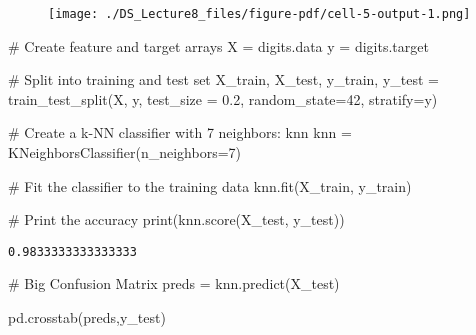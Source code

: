 \documentclass[
  letterpaper,
  DIV=11,
  numbers=noendperiod]{scrreprt}
\newenvironment{Shaded}{\begin{snugshade}}{\end{snugshade}}
\newcommand{\BuiltInTok}[1]{\textcolor[rgb]{0.00,0.23,0.31}{#1}}
\newcommand{\CommentTok}[1]{\textcolor[rgb]{0.37,0.37,0.37}{#1}}
\newcommand{\DecValTok}[1]{\textcolor[rgb]{0.68,0.00,0.00}{#1}}
\newcommand{\FloatTok}[1]{\textcolor[rgb]{0.68,0.00,0.00}{#1}}
\newcommand{\NormalTok}[1]{\textcolor[rgb]{0.00,0.23,0.31}{#1}}
\newcommand{\OperatorTok}[1]{\textcolor[rgb]{0.37,0.37,0.37}{#1}}
\begin{document}
\begin{figure}[H]

{\centering \texttt{[image: ./DS\_Lecture8\_files/figure-pdf/cell-5-output-1.png]}

}

\end{figure}

\begin{Shaded}
\begin{Highlighting}[]
\CommentTok{\# Create feature and target arrays}
\NormalTok{X }\OperatorTok{=}\NormalTok{ digits.data}
\NormalTok{y }\OperatorTok{=}\NormalTok{ digits.target}

\CommentTok{\# Split into training and test set}
\NormalTok{X\_train, X\_test, y\_train, y\_test }\OperatorTok{=}\NormalTok{ train\_test\_split(X, y, test\_size }\OperatorTok{=} \FloatTok{0.2}\NormalTok{, random\_state}\OperatorTok{=}\DecValTok{42}\NormalTok{, stratify}\OperatorTok{=}\NormalTok{y)}

\CommentTok{\# Create a k{-}NN classifier with 7 neighbors: knn}
\NormalTok{knn }\OperatorTok{=}\NormalTok{ KNeighborsClassifier(n\_neighbors}\OperatorTok{=}\DecValTok{7}\NormalTok{)}

\CommentTok{\# Fit the classifier to the training data}
\NormalTok{knn.fit(X\_train, y\_train)}

\CommentTok{\# Print the accuracy}
\BuiltInTok{print}\NormalTok{(knn.score(X\_test, y\_test))}
\end{Highlighting}
\end{Shaded}

\begin{verbatim}
0.9833333333333333
\end{verbatim}

\begin{Shaded}
\begin{Highlighting}[]
\CommentTok{\# Big Confusion Matrix}
\NormalTok{preds }\OperatorTok{=}\NormalTok{ knn.predict(X\_test)}

\NormalTok{pd.crosstab(preds,y\_test)}
\end{Highlighting}
\end{Shaded}
\end{document}
